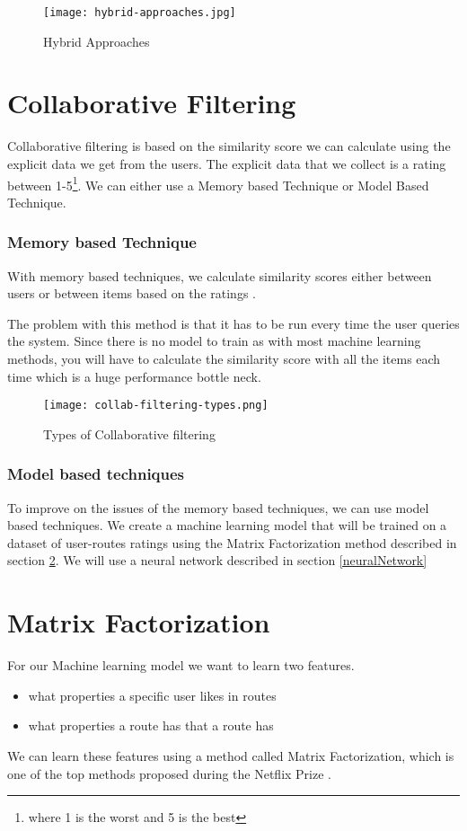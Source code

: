 \begin{figure}[ht]
    \centering
    \texttt{[image: hybrid-approaches.jpg]}
    \caption{Hybrid Approaches}
    \label{fig:hybridRecommenderSystems}
\end{figure}


\section{Collaborative Filtering}
Collaborative filtering is based on the similarity score we can calculate using the explicit data we get from the users. The explicit data that we collect is a rating between 1-5\footnote{where 1 is the worst and 5 is the best}. We can either use a Memory based Technique or Model Based Technique.

\subsubsection{Memory based Technique}
With memory based techniques, we calculate similarity scores either between users or between items based on the ratings \cite{wang2006unifying}. 

The problem with this method is that it has to be run every time the user queries the system. Since there is no model to train as with most machine learning methods, you will have to calculate the similarity score with all the items each time which is a huge performance bottle neck.
\begin{figure}[ht]
    \centering
    \texttt{[image: collab-filtering-types.png]}
    \caption{Types of Collaborative filtering}
    \label{fig:collabFilteringTypes}
\end{figure}

\subsubsection{Model based techniques}
To improve on the issues of the memory based techniques, we can use model based techniques. We create a machine learning model that will be trained on a dataset of user-routes ratings using the Matrix Factorization method described in section \ref{matrixFactorization}. We will use a neural network described in section \ref{neuralNetwork}
\section{Matrix Factorization} \label{matrixFactorization}
For our Machine learning model we want to learn two features. 
\begin{itemize}
    \item what properties a specific user likes in routes
    \item what properties a route has that a route has
\end{itemize}
We can learn these features using a method called Matrix Factorization, which is one of the top methods proposed during the Netflix Prize \cite{bell2007lessons}.

